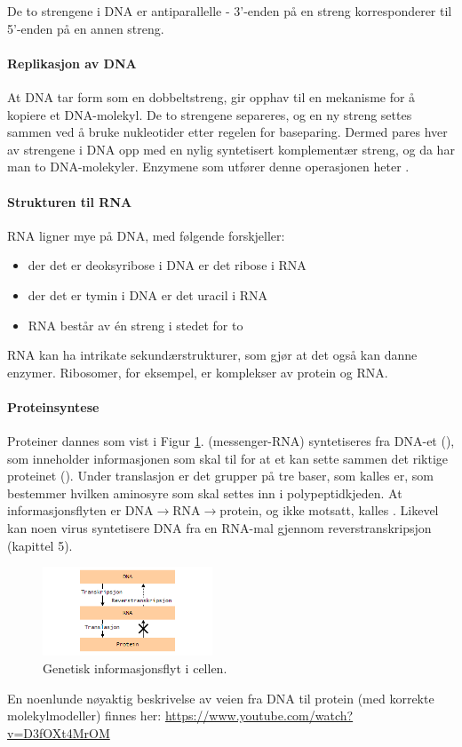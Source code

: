 De to strengene i DNA er antiparallelle - 3'-enden på en streng korresponderer til 5'-enden på en annen streng.

\paragraph{Replikasjon av DNA} At DNA tar form som en dobbeltstreng, gir opphav til en mekanisme for å kopiere et DNA-molekyl. De to strengene separeres, og en ny streng settes sammen ved å bruke nukleotider etter regelen for baseparing. Dermed pares hver av strengene i DNA opp med en nylig syntetisert komplementær streng, og da har man to DNA-molekyler. Enzymene som utfører denne operasjonen  heter .

\paragraph{Strukturen til RNA} RNA ligner mye på DNA, med følgende forskjeller: 
\begin{itemize}[nolistsep,noitemsep]
	\item der det er deoksyribose i DNA er det ribose i RNA
	\item der det er tymin i DNA er det uracil i RNA
	\item RNA består av én streng i stedet for to
\end{itemize}
RNA kan ha intrikate sekundærstrukturer, som gjør at det også kan danne enzymer. Ribosomer, for eksempel, er komplekser av protein og RNA.

\paragraph{Proteinsyntese} Proteiner dannes som vist i Figur \ref{fig:centraldogma}.  (messenger-RNA) syntetiseres fra DNA-et (), som inneholder informasjonen som skal til for at et  kan sette sammen det riktige proteinet (). Under translasjon er det grupper på tre baser, som kalles er, som bestemmer hvilken aminosyre som skal settes inn i polypeptidkjeden. At informasjonsflyten er DNA$\rightarrow$RNA$\rightarrow$protein, og ikke motsatt, kalles . Likevel kan noen virus syntetisere DNA fra en RNA-mal gjennom reverstranskripsjon (kapittel 5).
\begin{figure}[H]
	\centering
	\includegraphics[width=0.45\textwidth]{centraldogma}
	\caption{Genetisk informasjonsflyt i cellen.}
	\label{fig:centraldogma}
\end{figure}
En noenlunde nøyaktig beskrivelse av veien fra DNA til protein (med korrekte molekylmodeller) finnes her: \url{https://www.youtube.com/watch?v=D3fOXt4MrOM}

